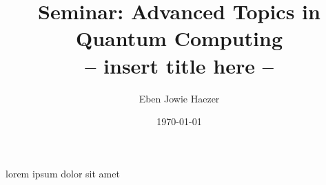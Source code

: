 \documentclass {article}
\title {
	Seminar: Advanced Topics in Quantum Computing \\
	-- insert title here --
}
\author {Eben Jowie Haezer}
\date {\today}
\begin{document}
\maketitle

lorem ipsum dolor sit amet
\end{document}

